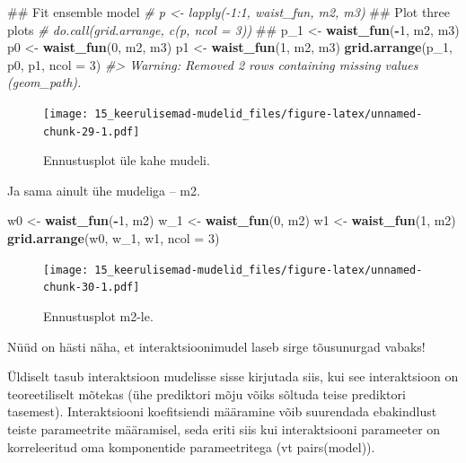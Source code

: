 \documentclass[]{book}
\newenvironment{Shaded}{\begin{snugshade}}{\end{snugshade}}
\newcommand{\KeywordTok}[1]{\textcolor[rgb]{0.13,0.29,0.53}{\textbf{#1}}}
\newcommand{\DataTypeTok}[1]{\textcolor[rgb]{0.13,0.29,0.53}{#1}}
\newcommand{\DecValTok}[1]{\textcolor[rgb]{0.00,0.00,0.81}{#1}}
\newcommand{\StringTok}[1]{\textcolor[rgb]{0.31,0.60,0.02}{#1}}
\newcommand{\CommentTok}[1]{\textcolor[rgb]{0.56,0.35,0.01}{\textit{#1}}}
\newcommand{\OperatorTok}[1]{\textcolor[rgb]{0.81,0.36,0.00}{\textbf{#1}}}
\newcommand{\NormalTok}[1]{#1}
\begin{document}
\begin{Shaded}
\begin{Highlighting}[]
\NormalTok{## Fit ensemble model}
\CommentTok{# p <- lapply(-1:1, waist_fun, m2, m3)}
\NormalTok{## Plot three plots}
\CommentTok{# do.call(grid.arrange, c(p, ncol = 3))}
\NormalTok{## }
\NormalTok{p_}\DecValTok{1}\NormalTok{ <-}\StringTok{ }\KeywordTok{waist_fun}\NormalTok{(}\OperatorTok{-}\DecValTok{1}\NormalTok{, m2, m3)}
\NormalTok{p0 <-}\StringTok{ }\KeywordTok{waist_fun}\NormalTok{(}\DecValTok{0}\NormalTok{, m2, m3)}
\NormalTok{p1 <-}\StringTok{ }\KeywordTok{waist_fun}\NormalTok{(}\DecValTok{1}\NormalTok{, m2, m3)}
\KeywordTok{grid.arrange}\NormalTok{(p_}\DecValTok{1}\NormalTok{, p0, p1, }\DataTypeTok{ncol =} \DecValTok{3}\NormalTok{)}
\CommentTok{#> Warning: Removed 2 rows containing missing values (geom_path).}
\end{Highlighting}
\end{Shaded}

\begin{figure}
\centering
\texttt{[image: 15\_keerulisemad-mudelid\_files/figure-latex/unnamed-chunk-29-1.pdf]}
\caption{\label{fig:unnamed-chunk-29}Ennustusplot üle kahe mudeli.}
\end{figure}

Ja sama ainult ühe mudeliga -- m2.

\begin{Shaded}
\begin{Highlighting}[]
\NormalTok{w0 <-}\StringTok{ }\KeywordTok{waist_fun}\NormalTok{(}\OperatorTok{-}\DecValTok{1}\NormalTok{, m2)}
\NormalTok{w_}\DecValTok{1}\NormalTok{ <-}\StringTok{ }\KeywordTok{waist_fun}\NormalTok{(}\DecValTok{0}\NormalTok{, m2)}
\NormalTok{w1 <-}\StringTok{ }\KeywordTok{waist_fun}\NormalTok{(}\DecValTok{1}\NormalTok{, m2)}
\KeywordTok{grid.arrange}\NormalTok{(w0, w_}\DecValTok{1}\NormalTok{, w1, }\DataTypeTok{ncol =} \DecValTok{3}\NormalTok{)}
\end{Highlighting}
\end{Shaded}

\begin{figure}
\centering
\texttt{[image: 15\_keerulisemad-mudelid\_files/figure-latex/unnamed-chunk-30-1.pdf]}
\caption{\label{fig:unnamed-chunk-30}Ennustusplot m2-le.}
\end{figure}

Nüüd on hästi näha, et interaktsioonimudel laseb sirge tõusunurgad
vabaks!

Üldiselt tasub interaktsioon mudelisse sisse kirjutada siis, kui see
interaktsioon on teoreetiliselt mõtekas (ühe prediktori mõju võiks
sõltuda teise prediktori tasemest). Interaktsiooni koefitsiendi
määramine võib suurendada ebakindlust teiste parameetrite määramisel,
seda eriti siis kui interaktsiooni parameeter on korreleeritud oma
komponentide parameetritega (vt pairs(model)).
\end{document}
